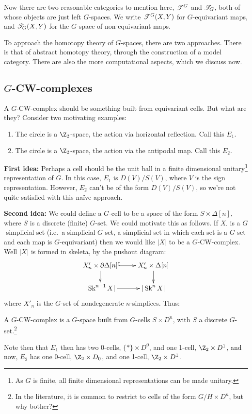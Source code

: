 \documentclass[11pt]{article}
\begin{document}
Now there are two reasonable categories to mention here, $\mathscr{T}^G$ and $\mathscr{T}_G$, both of whose objects are just left $G$-spaces. We write $\mathscr{T}^G(X,Y)$ for $G$-equivariant maps, and $\mathscr{T}_G(X,Y)$ for the $G$-space of non-equivariant maps.

To approach the homotopy theory of $G$-spaces, there are two approaches. There is that of abstract homotopy theory, through the construction of a model category. There are also the more computational aspects, which we discuss now.
\subsection*{$G$-CW-complexes}
A $G$-CW-complex should be something built from equivariant cells. But what are they? Consider two motivating examples:
\begin{enumerate}\squishlist
\item The circle is a $\Z_2$-space, the action via horizontal reflection. Call this $E_1$.
\item The circle is a $\Z_2$-space, the action via the antipodal map. Call this $E_2$.
\end{enumerate}
\textbf{First idea:} Perhaps a cell should be the unit ball in a finite dimensional unitary\footnote{As $G$ is finite, all finite dimensional representations can be made unitary.} representation of $G$.
In this case, $E_1$ is $D(V)/S(V)$, where $V$ is the sign representation. However, $E_2$ can't be of the form $D(V)/S(V)$, so we're not quite satisfied with this na\"ive approach.

\noindent \textbf{Second idea:} We could define a $G$-cell to be a space of the form $S\times \Delta[n]$, where $S$ is a discrete (finite) $G$-set. We could motivate this as follows. If $X_\cdot$ is a $G$-simplicial set (i.e.\ a simplicial $G$-set, a simplicial set in which each set is a $G$-set and each map is $G$-equivariant) then we would like $|X|$ to be a $G$-CW-complex. Well $|X|$ is formed in skeleta, by the pushout diagram:
\[\xymatrix@R=.6cm{
\ar[d]X'_n\times\partial\Delta[n]\ar@{^{(}->}[r]&X'_n\times\Delta[n]\ar[d]\\
|\Skel^{n-1}X|\ar[r]&|\Skel^nX|
}\]
where $X'_n$ is the $G$-set of nondegenerate $n$-simplices. Thus:
\begin{defn*}
A $G$-CW-complex is a $G$-space built from $G$-cells $S\times D^n$, with $S$ a discrete  $G$-set.\footnote{In the literature, it is common to restrict to cells of the form $G/H\times D^n$, but why bother?}
\end{defn*}
Note then that $E_1$ then has two $0$-cells, $\{*\}\times D^0$, and one 1-cell, $\Z_2\times D^1$, and now, $E_2$ has one $0$-cell, $\Z_2\times D_0$, and one 1-cell, $\Z_2\times D^1$.
\end{document}
